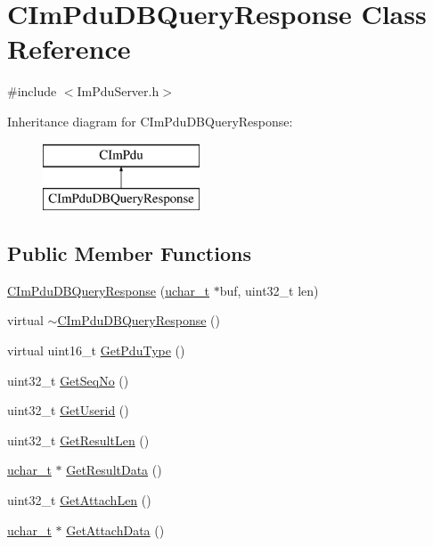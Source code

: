 \hypertarget{class_c_im_pdu_d_b_query_response}{}\section{C\+Im\+Pdu\+D\+B\+Query\+Response Class Reference}
\label{class_c_im_pdu_d_b_query_response}


{\ttfamily \#include $<$Im\+Pdu\+Server.\+h$>$}

Inheritance diagram for C\+Im\+Pdu\+D\+B\+Query\+Response\+:\begin{figure}[H]
\begin{center}
\leavevmode
\includegraphics[height=2.000000cm]{class_c_im_pdu_d_b_query_response}
\end{center}
\end{figure}
\subsection*{Public Member Functions}
\begin{DoxyCompactItemize}
\item 
\hyperlink{class_c_im_pdu_d_b_query_response_aa8ce2206b50cd12ef2b3bfcddb72a71d}{C\+Im\+Pdu\+D\+B\+Query\+Response} (\hyperlink{base_2ostype_8h_a124ea0f8f4a23a0a286b5582137f0b8d}{uchar\+\_\+t} $\ast$buf, uint32\+\_\+t len)
\item 
virtual \hyperlink{class_c_im_pdu_d_b_query_response_a7c7d390b3057ee29743e6fa3ce1fbcb2}{$\sim$\+C\+Im\+Pdu\+D\+B\+Query\+Response} ()
\item 
virtual uint16\+\_\+t \hyperlink{class_c_im_pdu_d_b_query_response_a1c89fd02a6696abf288d12973ad3ba0b}{Get\+Pdu\+Type} ()
\item 
uint32\+\_\+t \hyperlink{class_c_im_pdu_d_b_query_response_ab716dffd7eaa55fe4b7573a9927ff6d5}{Get\+Seq\+No} ()
\item 
uint32\+\_\+t \hyperlink{class_c_im_pdu_d_b_query_response_aa591e6cd0bc44c8a7abe52bf11b7e256}{Get\+Userid} ()
\item 
uint32\+\_\+t \hyperlink{class_c_im_pdu_d_b_query_response_a559bd20b3a050241231003a76ee518bf}{Get\+Result\+Len} ()
\item 
\hyperlink{base_2ostype_8h_a124ea0f8f4a23a0a286b5582137f0b8d}{uchar\+\_\+t} $\ast$ \hyperlink{class_c_im_pdu_d_b_query_response_a7f21e1ff4d826693fcf302dcca490ec0}{Get\+Result\+Data} ()
\item 
uint32\+\_\+t \hyperlink{class_c_im_pdu_d_b_query_response_a3fd9511c2a3d15f3987dd9006de53297}{Get\+Attach\+Len} ()
\item 
\hyperlink{base_2ostype_8h_a124ea0f8f4a23a0a286b5582137f0b8d}{uchar\+\_\+t} $\ast$ \hyperlink{class_c_im_pdu_d_b_query_response_ac7c3236901fbf7c6ca0f6ab2f89d7311}{Get\+Attach\+Data} ()
\end{DoxyCompactItemize}
